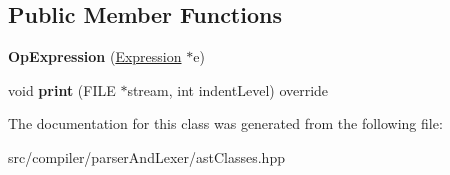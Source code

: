 \subsection*{Public Member Functions}
\begin{DoxyCompactItemize}
\item 
{\bfseries Op\+Expression} (\hyperlink{classslang__AST__NODES_1_1Expression}{Expression} $\ast$e)\hypertarget{classslang__AST__NODES_1_1OpExpression_a870357f321a081a5052a3c0f312a77bf}{}\label{classslang__AST__NODES_1_1OpExpression_a870357f321a081a5052a3c0f312a77bf}

\item 
void {\bfseries print} (F\+I\+LE $\ast$stream, int indent\+Level) override\hypertarget{classslang__AST__NODES_1_1OpExpression_a6e39980dad216f83c4cc52609d80bd39}{}\label{classslang__AST__NODES_1_1OpExpression_a6e39980dad216f83c4cc52609d80bd39}

\end{DoxyCompactItemize}


The documentation for this class was generated from the following file\+:\begin{DoxyCompactItemize}
\item 
src/compiler/parser\+And\+Lexer/ast\+Classes.\+hpp\end{DoxyCompactItemize}

